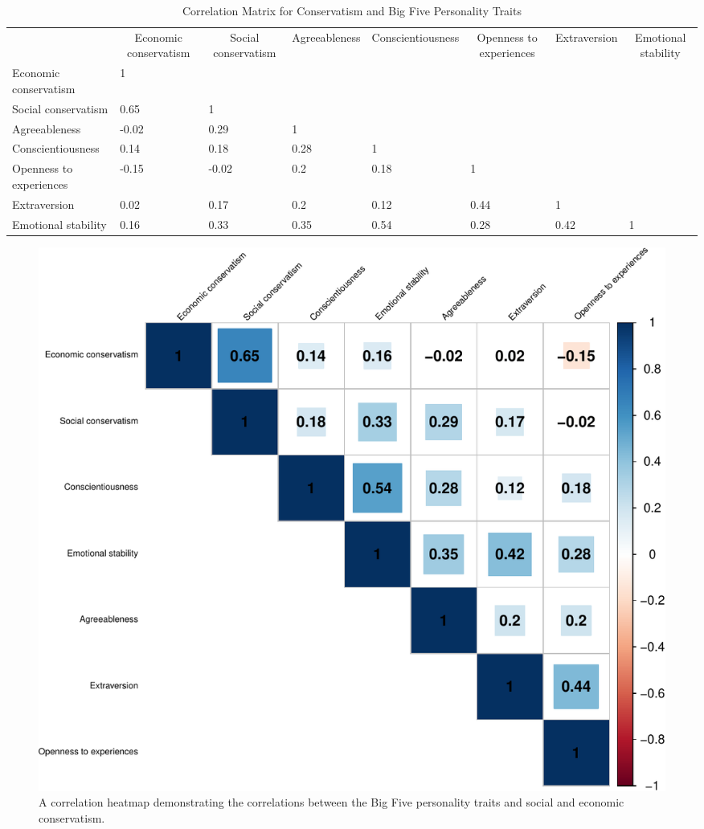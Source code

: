 \documentclass[man]{apa6}
\makeatletter
\newenvironment{lltable}{\begin{landscape}\begin{center}\begin{ThreePartTable}}{\end{ThreePartTable}\end{center}\end{landscape}}
\newcommand\LastLTentrywidth{1em}
\newlength\longtablewidth
\newcommand{\getlongtablewidth}{\begingroup \ifcsname LT@\roman{LT@tables}\endcsname \global\longtablewidth=0pt \renewcommand{\LT@entry}[2]{\global\advance\longtablewidth by ##2\relax\gdef\LastLTentrywidth{##2}}\@nameuse{LT@\roman{LT@tables}} \fi \endgroup}
\makeatother
\begin{document}
\begin{lltable}


\tiny{
\begin{longtable}{llllllll}\noalign{\getlongtablewidth\global\LTcapwidth=\longtablewidth}
\caption{\label{tab:correlations}Correlation Matrix for Conservatism and Big Five Personality Traits}\\
\toprule
 & \multicolumn{1}{c}{Economic conservatism} & \multicolumn{1}{c}{Social conservatism} & \multicolumn{1}{c}{Agreeableness} & \multicolumn{1}{c}{Conscientiousness} & \multicolumn{1}{c}{Openness to experiences} & \multicolumn{1}{c}{Extraversion} & \multicolumn{1}{c}{Emotional stability}\\
\midrule
Economic conservatism & 1 &  &  &  &  &  & \\
Social conservatism & 0.65 & 1 &  &  &  &  & \\
Agreeableness & -0.02 & 0.29 & 1 &  &  &  & \\
Conscientiousness & 0.14 & 0.18 & 0.28 & 1 &  &  & \\
Openness to experiences & -0.15 & -0.02 & 0.2 & 0.18 & 1 &  & \\
Extraversion & 0.02 & 0.17 & 0.2 & 0.12 & 0.44 & 1 & \\
Emotional stability & 0.16 & 0.33 & 0.35 & 0.54 & 0.28 & 0.42 & 1\\
\bottomrule
\end{longtable}
}
\end{lltable}

\begin{figure}
\centering
\includegraphics{manuscript_files/figure-latex/figure1-1.pdf}
\caption{\label{fig:figure1}A correlation heatmap demonstrating the correlations between the Big Five personality traits and social and economic conservatism.}
\end{figure}
\end{document}
